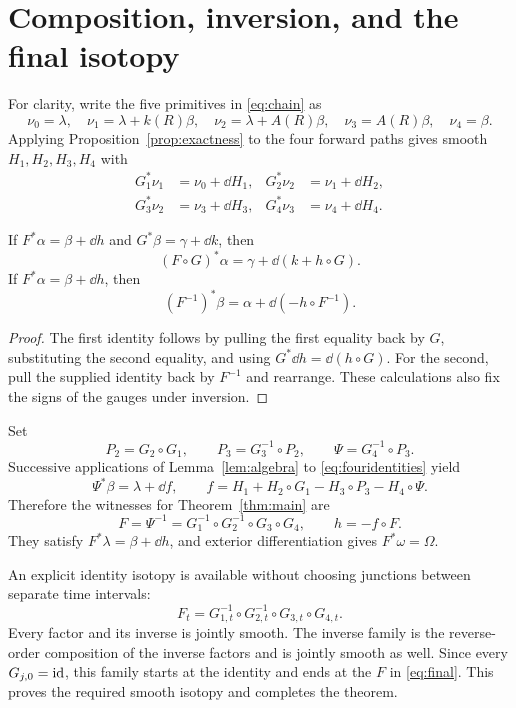 \section{Composition, inversion, and the final isotopy}
For clarity, write the five primitives in \eqref{eq:chain} as
\[
 \nu_0=\lambda,\quad \nu_1=\lambda+k(R)\beta,\quad
 \nu_2=\lambda+A(R)\beta,\quad
 \nu_3=A(R)\beta,\quad \nu_4=\beta .
\]
Applying Proposition~\ref{prop:exactness} to the four forward paths
gives smooth $H_1,H_2,H_3,H_4$ with
\begin{equation}\label{eq:fouridentities}
\begin{aligned}
 G_1^*\nu_1&=\nu_0+\dd H_1,&
 G_2^*\nu_2&=\nu_1+\dd H_2,\\
 G_3^*\nu_2&=\nu_3+\dd H_3,&
 G_4^*\nu_3&=\nu_4+\dd H_4 .
\end{aligned}
\end{equation}

\begin{lemma}\label{lem:algebra}
If $F^*\alpha=\beta+\dd h$ and $G^*\beta=\gamma+\dd k$, then
\[
 (F\circ G)^*\alpha=\gamma+\dd(k+h\circ G).
\]
If $F^*\alpha=\beta+\dd h$, then
\[
 (F^{-1})^*\beta=\alpha+\dd(-h\circ F^{-1}).
\]
\end{lemma}
\begin{proof}
The first identity follows by pulling the first equality back by
$G$, substituting the second equality, and using
$G^*\dd h=\dd(h\circ G)$.
For the second, pull the supplied identity back by $F^{-1}$
and rearrange. These calculations also fix the signs of the
gauges under inversion.
\end{proof}

Set
\[
 P_2=G_2\circ G_1,\qquad
 P_3=G_3^{-1}\circ P_2,\qquad
 \Psi=G_4^{-1}\circ P_3.
\]
Successive applications of Lemma~\ref{lem:algebra} to
\eqref{eq:fouridentities} yield
\[
 \Psi^*\beta=\lambda+\dd f,\qquad
 f=H_1+H_2\circ G_1-H_3\circ P_3-H_4\circ\Psi .
\]
Therefore the witnesses for Theorem~\ref{thm:main} are
\begin{equation}\label{eq:final}
 F=\Psi^{-1}=G_1^{-1}\circ G_2^{-1}\circ G_3\circ G_4,
 \qquad h=-f\circ F.
\end{equation}
They satisfy $F^*\lambda=\beta+\dd h$, and exterior differentiation
gives $F^*\omega=\Omega$.

An explicit identity isotopy is available without choosing
junctions between separate time intervals:
\[
 F_t=G_{1,t}^{-1}\circ G_{2,t}^{-1}\circ G_{3,t}\circ G_{4,t}.
\]
Every factor and its inverse is jointly smooth.
The inverse family is the reverse-order composition of the inverse
factors and is jointly smooth as well.
Since every $G_{j,0}=\mathrm{id}$, this family starts at the identity and
ends at the $F$ in \eqref{eq:final}.
This proves the required smooth isotopy and completes the theorem.

